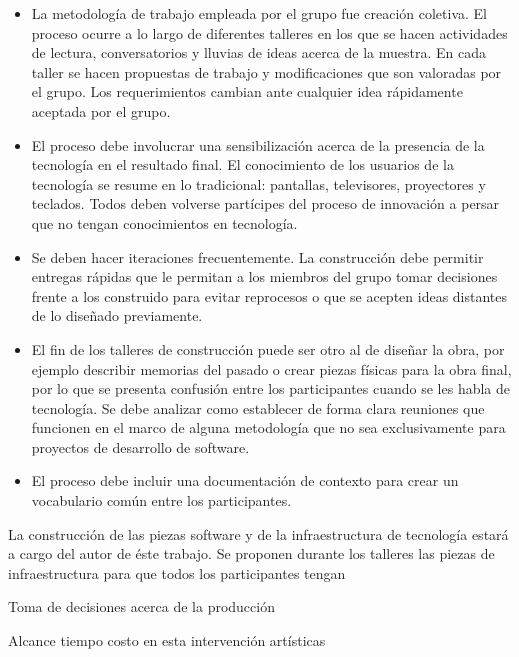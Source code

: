 \begin{itemize}

    \item La metodología de trabajo empleada por el grupo fue creación coletiva. El proceso ocurre a lo largo de diferentes talleres en los que se hacen actividades de lectura, conversatorios y lluvias de ideas acerca de la muestra. En cada taller se hacen propuestas de trabajo y modificaciones que son valoradas por el grupo. Los requerimientos cambian ante cualquier idea rápidamente aceptada por el grupo.

    \item El proceso debe involucrar una sensibilización acerca de la presencia de la tecnología en el resultado final. El conocimiento de los usuarios de la tecnología se resume en lo tradicional: pantallas, televisores, proyectores y teclados. Todos deben volverse partícipes del proceso de innovación a persar que no tengan conocimientos en tecnología.

    \item Se deben hacer iteraciones frecuentemente. La construcción debe permitir entregas rápidas que le permitan a los miembros del grupo tomar decisiones frente a los construido para evitar reprocesos o que se acepten ideas distantes de lo diseñado previamente.

    \item El fin de los talleres de construcción puede ser otro al de diseñar la obra, por ejemplo describir memorias del pasado o crear piezas físicas para la obra final, por lo que se presenta confusión entre los participantes cuando se les habla de tecnología. Se debe analizar como establecer de forma clara reuniones que funcionen en el marco de alguna metodología que no sea exclusivamente para proyectos de desarrollo de software.

    \item El proceso debe incluir una documentación de contexto para crear un vocabulario común entre los participantes.

\end{itemize}

La construcción de las piezas software y de la infraestructura de tecnología estará a cargo del autor de éste trabajo. Se proponen durante los talleres las piezas de infraestructura para que todos los participantes tengan 

Toma de decisiones acerca de la producción

Alcance tiempo costo en esta intervención artísticas

